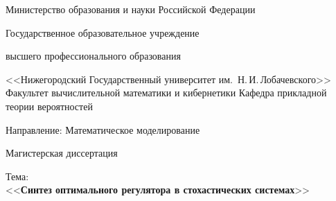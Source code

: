 


\newcommand{\underscore}[1]{\underline{\hspace*{#1cm}}} %
\thispagestyle{empty}


\begin{titlepage}

    \begin{center}
        Министерство образования и науки Российской Федерации\vspace{1.5mm}
        
        Государственное образовательное учреждение\vspace{0.7mm}
        
        высшего профессионального образования\vspace{1.5mm}
        
        <<Нижегородский Государственный университет им.~Н.\,И.\,Лобачевского>>
        \vspace{1.2cm}        
        {
             \selectfont
            Факультет вычислительной математики и кибернетики
        }
        \vspace{1.5mm}        
        {
             \selectfont
            Кафедра прикладной теории вероятностей
        }

        \vspace{3mm}
        {
            Направление: Математическое моделирование
        }

        \vspace{2cm}

        {
            \fontsize{27pt}{18pt}  \selectfont
            Магистерская диссертация
        }

        \vspace{2cm}
        
        {
            Тема: \\
            { <<\textbf{Синтез оптимального регулятора в стохастических системах}>>}
        }
    \end{center}


\end{titlepage}
